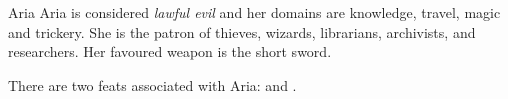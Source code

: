 \begin{35e}{Aria}
  Aria is considered \emph{lawful evil} and her domains are knowledge, travel,
  magic and trickery. She is the patron of thieves, wizards, librarians,
  archivists, and researchers. Her favoured weapon is the short sword.

  There are two feats associated with Aria:  and
  .
\end{35e}
